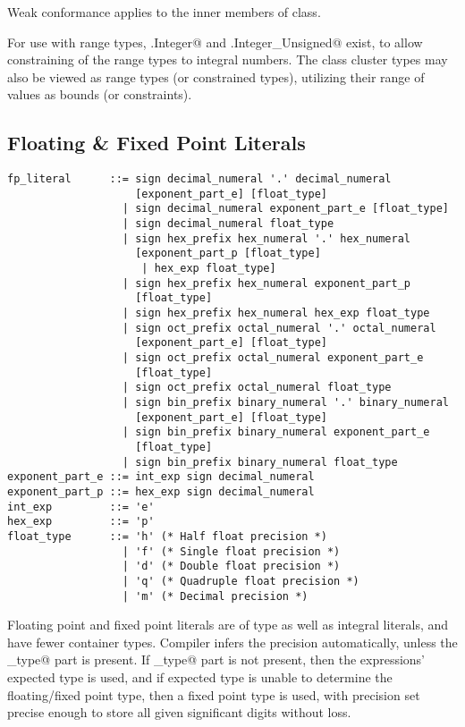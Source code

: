 Weak conformance applies to the inner members of \lstinline@Number@ class. 

For use with range types, \lstinline@Number.Integer@ and \lstinline@Number.Integer_Unsigned@ exist, to allow constraining of the range types to integral numbers. The class cluster types may also be viewed as range types (or constrained types), utilizing their range of values as bounds (or constraints). 






\subsection{Floating \& Fixed Point Literals}
\label{sec:floatliterals}
\label{sec:fixedpointliterals}

\syntax\begin{lstlisting}
fp_literal      ::= sign decimal_numeral '.' decimal_numeral
                    [exponent_part_e] [float_type]
                  | sign decimal_numeral exponent_part_e [float_type]
                  | sign decimal_numeral float_type
                  | sign hex_prefix hex_numeral '.' hex_numeral 
                    [exponent_part_p [float_type] 
                     | hex_exp float_type]
                  | sign hex_prefix hex_numeral exponent_part_p 
                    [float_type]
                  | sign hex_prefix hex_numeral hex_exp float_type
                  | sign oct_prefix octal_numeral '.' octal_numeral 
                    [exponent_part_e] [float_type]
                  | sign oct_prefix octal_numeral exponent_part_e 
                    [float_type]
                  | sign oct_prefix octal_numeral float_type
                  | sign bin_prefix binary_numeral '.' binary_numeral 
                    [exponent_part_e] [float_type]
                  | sign bin_prefix binary_numeral exponent_part_e 
                    [float_type]
                  | sign bin_prefix binary_numeral float_type
exponent_part_e ::= int_exp sign decimal_numeral
exponent_part_p ::= hex_exp sign decimal_numeral
int_exp         ::= 'e'
hex_exp         ::= 'p'
float_type      ::= 'h' (* Half float precision *)
                  | 'f' (* Single float precision *)
                  | 'd' (* Double float precision *)
                  | 'q' (* Quadruple float precision *)
                  | 'm' (* Decimal precision *)
\end{lstlisting}

Floating point and fixed point literals are of type \lstinline@Number@ as well as integral literals, and have fewer container types. Compiler infers the precision automatically, unless the \lstinline@float_type@ part is present. If \lstinline@float_type@ part is not present, then the expressions' expected type is used, and if expected type is unable to determine the floating/fixed point type, then a fixed point type is used, with precision set precise enough to store all given significant digits without loss. 

